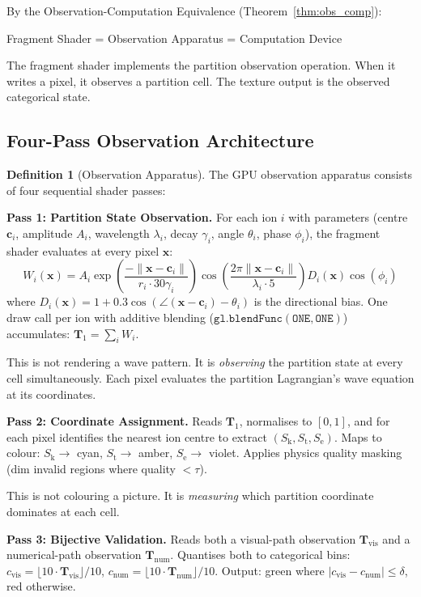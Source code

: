 \documentclass[11pt,twocolumn,a4paper]{article}
\theoremstyle{definition}
\newtheorem{definition}[theorem]{Definition}
\theoremstyle{remark}
\newcommand{\Sk}{S_{\mathrm{k}}}
\newcommand{\St}{S_{\mathrm{t}}}
\newcommand{\Se}{S_{\mathrm{e}}}
\newcommand{\Texture}{\mathbf{T}}
\begin{document}
By the Observation-Computation Equivalence (Theorem~\ref{thm:obs_comp}):
\begin{center}
Fragment Shader = Observation Apparatus = Computation Device
\end{center}
The fragment shader implements the partition observation operation. When it writes a pixel, it observes a partition cell. The texture output is the observed categorical state.

\subsection{Four-Pass Observation Architecture}

\begin{definition}[Observation Apparatus]
The GPU observation apparatus consists of four sequential shader passes:
\end{definition}

\textbf{Pass 1: Partition State Observation.} For each ion $i$ with parameters (centre $\mathbf{c}_i$, amplitude $A_i$, wavelength $\lambda_i$, decay $\gamma_i$, angle $\theta_i$, phase $\phi_i$), the fragment shader evaluates at every pixel $\mathbf{x}$:
\begin{equation}
W_i(\mathbf{x}) = A_i \exp\!\left(\frac{-\|\mathbf{x} - \mathbf{c}_i\|}{r_i \cdot 30\gamma_i}\right) \cos\!\left(\frac{2\pi\|\mathbf{x} - \mathbf{c}_i\|}{\lambda_i \cdot 5}\right) D_i(\mathbf{x}) \cos(\phi_i)
\label{eq:wave}
\end{equation}
where $D_i(\mathbf{x}) = 1 + 0.3\cos(\angle(\mathbf{x} - \mathbf{c}_i) - \theta_i)$ is the directional bias. One draw call per ion with additive blending ($\mathtt{gl.blendFunc(ONE, ONE)}$) accumulates: $\Texture_1 = \sum_i W_i$.

This is not rendering a wave pattern. It is \emph{observing} the partition state at every cell simultaneously. Each pixel evaluates the partition Lagrangian's wave equation at its coordinates.

\textbf{Pass 2: Coordinate Assignment.} Reads $\Texture_1$, normalises to $[0,1]$, and for each pixel identifies the nearest ion centre to extract $(\Sk, \St, \Se)$. Maps to colour: $\Sk \to$ cyan, $\St \to$ amber, $\Se \to$ violet. Applies physics quality masking (dim invalid regions where quality $< \tau$).

This is not colouring a picture. It is \emph{measuring} which partition coordinate dominates at each cell.

\textbf{Pass 3: Bijective Validation.} Reads both a visual-path observation $\Texture_{\mathrm{vis}}$ and a numerical-path observation $\Texture_{\mathrm{num}}$. Quantises both to categorical bins: $c_{\mathrm{vis}} = \lfloor 10 \cdot \Texture_{\mathrm{vis}} \rfloor / 10$, $c_{\mathrm{num}} = \lfloor 10 \cdot \Texture_{\mathrm{num}} \rfloor / 10$. Output: green where $|c_{\mathrm{vis}} - c_{\mathrm{num}}| \leq \delta$, red otherwise.
\end{document}
